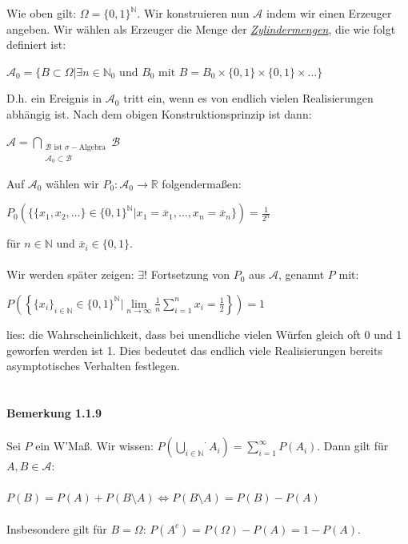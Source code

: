 \documentclass[10pt,a4paper]{report}
\numberwithin{equation}{section}
\numberwithin{figure}{section}
\theoremstyle{plain}
\theoremstyle{definition}
\theoremstyle{plain}
\theoremstyle{definition}
\theoremstyle{remark}
\theoremstyle{plain}
\theoremstyle{plain}
\theoremstyle{plain}
\newcommand{\1}{ \mathbb{1} } %
\begin{document}
Wie oben gilt: $\Omega=\{0,1\}^\mathbb{N}$. Wir konstruieren nun $\mathcal{A}$ indem wir einen Erzeuger angeben. Wir wählen als Erzeuger die Menge der \textit{\underline{Zylindermengen}}, die wie folgt definiert ist:
\begin{center}
$\mathcal{A}_0=\{B\subset \Omega|\exists n \in \mathbb{N}_0 \text{ und } B_0 \text{ mit } B=B_0\times\{0,1\}\times \{0,1\}\times\dots \} $
\end{center}
D.h. ein Ereignis in $\mathcal{A}_0$ tritt ein, wenn es von endlich vielen Realisierungen abhängig ist. Nach dem obigen Konstruktionsprinzip ist dann:
\begin{center}
$\mathcal{A}=\bigcap\limits_{\substack{\mathcal{B} \text{ ist }  \sigma-\text{Algebra}\\ \mathcal{A}_0\subset \mathcal{B}}}\mathcal{B}$
\end{center}       
Auf $\mathcal{A}_0$ wählen wir $P_0: \mathcal{A}_0 \to \mathbb{R}$ folgendermaßen:
\begin{center}
$P_0(\{\{x_1,x_2,\dots\}\in \{0,1\}^\mathbb{N}|x_1=\overline{x}_1,\dots,x_n=\overline{x}_n\})=\frac{1}{2^n}$
\end{center}
für $n \in \mathbb{N}$ und $\overline{x}_i \in \{0,1\}$.\\\\
Wir werden später zeigen: $\exists !$ Fortsetzung von $P_0$ aus $\mathcal{A}$, genannt $P$ mit:\begin{center}
$P\left(\left\{\{x_i\}_{i \in \mathbb{N}} \in \{0,1\}^\mathbb{N}| \lim\limits_{n \to \infty} \frac{1}{n}\sum\limits_{i=1}^n x_i=\frac{1}{2}\right\}\right)=1$
\end{center}
lies: die Wahrscheinlichkeit, dass bei unendliche vielen Würfen gleich oft 0 und 1 geworfen werden ist 1. Dies bedeutet das endlich viele Realisierungen bereits asymptotisches Verhalten festlegen.\\\\\\
\textbf{Bemerkung 1.1.9}\\\\
Sei $P$ ein W'Maß. Wir wissen: $P\left(\stackrel{\cdot}{\bigcup\limits_{i \in \mathbb{N}}}A_i\right)=\sum\limits_{i=1}^\infty P(A_i)$. Dann gilt für $A,B \in \mathcal{A}$:\\\\
$P(B)=P(A)+P(B\setminus A) \Leftrightarrow P(B\setminus A)=P(B)-P(A)$\\\\
Insbesondere gilt für $B=\Omega$: $P(A^c)=P(\Omega)-P(A)=1-P(A)$.\\\\
\end{document}
